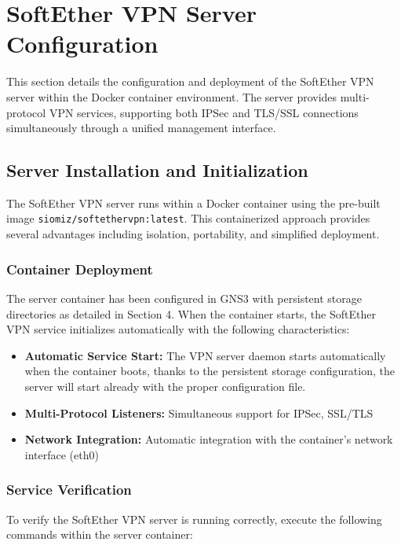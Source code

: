 \newpage

\section{SoftEther VPN Server Configuration}

This section details the configuration and deployment of the SoftEther VPN server within the Docker container environment. The server provides multi-protocol VPN services, supporting both IPSec and TLS/SSL connections simultaneously through a unified management interface.

\subsection{Server Installation and Initialization}

The SoftEther VPN server runs within a Docker container using the pre-built image \texttt{siomiz/softethervpn:latest}. This containerized approach provides several advantages including isolation, portability, and simplified deployment.

\subsubsection{Container Deployment}

The server container has been configured in GNS3 with persistent storage directories as detailed in Section 4. When the container starts, the SoftEther VPN service initializes automatically with the following characteristics:

\begin{itemize}
    \item \textbf{Automatic Service Start:} The VPN server daemon starts automatically when the container boots, thanks to the persistent storage configuration, the server will start already with the proper configuration file.
    \item \textbf{Multi-Protocol Listeners:} Simultaneous support for IPSec, SSL/TLS
    \item \textbf{Network Integration:} Automatic integration with the container's network interface (eth0)
\end{itemize}

\subsubsection{Service Verification}

To verify the SoftEther VPN server is running correctly, execute the following commands within the server container:

